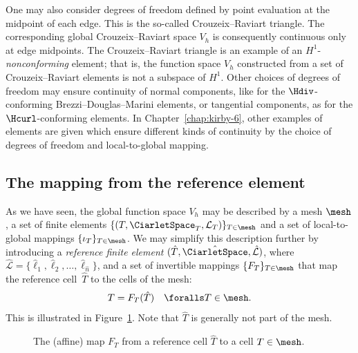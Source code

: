 %
One may also consider degrees of freedom defined by point evaluation
at the midpoint of each edge. This is the so-called Crouzeix--Raviart
triangle. The corresponding global Crouzeix--Raviart space $V_h$ is
consequently continuous only at edge midpoints. The Crouzeix--Raviart
triangle is an example of an $H^1$-\emph{nonconforming} element; that
is, the function space $V_h$ constructed from a set of
Crouzeix--Raviart elements is not a subspace of $H^1$. Other choices
of degrees of freedom may ensure continuity of normal components, like
for the $\Hdiv$-conforming Brezzi--Douglas--Marini elements, or
tangential components, as for the $\Hcurl$-conforming \nedelec{}
elements. In Chapter~\ref{chap:kirby-6}, other examples of elements
are given which ensure different kinds of continuity by the choice of
degrees of freedom and local-to-global mapping.

\subsection{The mapping from the reference element}

As we have seen, the global function space $V_h$ may be described by a
mesh $\mesh$, a set of finite elements
$\{(T,\CiarletSpace_T,\mathcal{L}_T)\}_{T\in\mesh}$ and a set of
local-to-global mappings $\{\iota_T\}_{T\in\mesh}$. We may simplify
this description further by introducing a \emph{reference finite
  element} $(\hat{T},\hat{\CiarletSpace},\hat{\mathcal{L}})$,
where $\hat{\mathcal{L}} =
\{\hat{\ell}_1,\hat{\ell}_2,\ldots,\hat{\ell}_{\hat{n}}\}$, and
a set of invertible mappings $\{F_T\}_{T\in\mesh}$ that map the
reference cell~$\hat{T}$ to the cells of the mesh:
\begin{equation}
  T = F_T(\hat{T}) \quad \foralls T \in \mesh.
\end{equation}
This is illustrated in Figure~\ref{fig:kirby-7:affinemap}. Note that
$\hat{T}$ is generally not part of the mesh.

\begin{figure}
  \begin{center}
    \caption{The (affine) map $F_T$ from a reference cell $\hat{T}$
      to a cell $T \in \mesh$.}
    \label{fig:kirby-7:affinemap}
  \end{center}
\end{figure}

